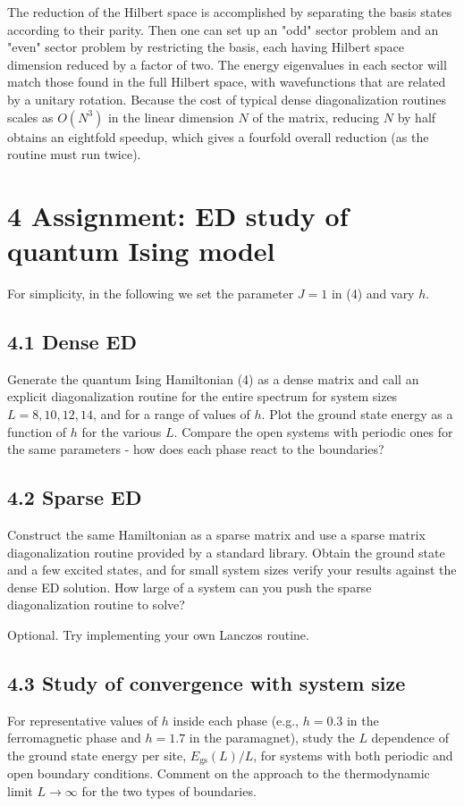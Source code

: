 \documentclass[10pt]{article}
\begin{document}
The reduction of the Hilbert space is accomplished by separating the basis states according to their parity. Then one can set up an "odd" sector problem and an "even" sector problem by restricting the basis, each having Hilbert space dimension reduced by a factor of two. The energy eigenvalues in each sector will match those found in the full Hilbert space, with wavefunctions that are related by a unitary rotation. Because the cost of typical dense diagonalization routines scales as $O\left(N^{3}\right)$ in the linear dimension $N$ of the matrix, reducing $N$ by half obtains an eightfold speedup, which gives a fourfold overall reduction (as the routine must run twice).

\section*{4 Assignment: ED study of quantum Ising model}
For simplicity, in the following we set the parameter $J=1$ in (4) and vary $h$.

\subsection*{4.1 Dense ED}
Generate the quantum Ising Hamiltonian (4) as a dense matrix and call an explicit diagonalization routine for the entire spectrum for system sizes $L=8,10,12,14$, and for a range of values of $h$. Plot the ground state energy as a function of $h$ for the various $L$. Compare the open systems with periodic ones for the same parameters - how does each phase react to the boundaries?

\subsection*{4.2 Sparse ED}
Construct the same Hamiltonian as a sparse matrix and use a sparse matrix diagonalization routine provided by a standard library. Obtain the ground state and a few excited states, and for small system sizes verify your results against the dense ED solution. How large of a system can you push the sparse diagonalization routine to solve?

Optional. Try implementing your own Lanczos routine.

\subsection*{4.3 Study of convergence with system size}
For representative values of $h$ inside each phase (e.g., $h=0.3$ in the ferromagnetic phase and $h=1.7$ in the paramagnet), study the $L$ dependence of the ground state energy per site, $E_{\mathrm{gs}}(L) / L$, for systems with both periodic and open boundary conditions. Comment on the approach to the thermodynamic limit $L \rightarrow \infty$ for the two types of boundaries.
\end{document}
